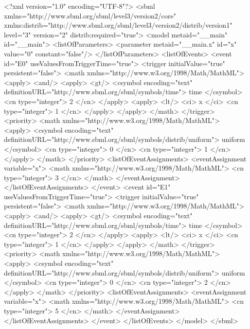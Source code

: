 \documentclass[draftspec]{sbmlpkgspec}
\begin{document}
\begin{example}
<?xml version="1.0" encoding="UTF-8"?>
<sbml xmlns="http://www.sbml.org/sbml/level3/version2/core"
      xmlns:distrib="http://www.sbml.org/sbml/level3/version2/distrib/version1"
      level="3" version="2" distrib:required="true">
  <model metaid="__main" id="__main">
    <listOfParameters>
      <parameter metaid="__main.x" id="x" value="0" constant="false"/>
    </listOfParameters>
    <listOfEvents>
      <event id="E0" useValuesFromTriggerTime="true">
        <trigger initialValue="true" persistent="false">
          <math xmlns="http://www.w3.org/1998/Math/MathML">
            <apply>
              <and/>
              <apply>
                <gt/>
                <csymbol encoding="text" definitionURL="http://www.sbml.org/sbml/symbols/time">
                         time </csymbol>
                <cn type="integer"> 2 </cn>
              </apply>
              <apply>
                <lt/>
                <ci> x </ci>
                <cn type="integer"> 1 </cn>
              </apply>
            </apply>
          </math>
        </trigger>
        <priority>
          <math xmlns="http://www.w3.org/1998/Math/MathML">
            <apply>
              <csymbol encoding="text" definitionURL="http://www.sbml.org/sbml/symbols/distrib/uniform">
                       uniform </csymbol>
              <cn type="integer"> 0 </cn>
              <cn type="integer"> 1 </cn>
            </apply>
          </math>
        </priority>
        <listOfEventAssignments>
          <eventAssignment variable="x">
            <math xmlns="http://www.w3.org/1998/Math/MathML">
              <cn type="integer"> 3 </cn>
            </math>
          </eventAssignment>
        </listOfEventAssignments>
      </event>
      <event id="E1" useValuesFromTriggerTime="true">
        <trigger initialValue="true" persistent="false">
          <math xmlns="http://www.w3.org/1998/Math/MathML">
            <apply>
              <and/>
              <apply>
                <gt/>
                <csymbol encoding="text" definitionURL="http://www.sbml.org/sbml/symbols/time">
                         time </csymbol>
                <cn type="integer"> 2 </cn>
              </apply>
              <apply>
                <lt/>
                <ci> x </ci>
                <cn type="integer"> 1 </cn>
              </apply>
            </apply>
          </math>
        </trigger>
        <priority>
          <math xmlns="http://www.w3.org/1998/Math/MathML">
            <apply>
              <csymbol encoding="text" definitionURL="http://www.sbml.org/sbml/symbols/distrib/uniform">
                       uniform </csymbol>
              <cn type="integer"> 0 </cn>
              <cn type="integer"> 2 </cn>
            </apply>
          </math>
        </priority>
        <listOfEventAssignments>
          <eventAssignment variable="x">
            <math xmlns="http://www.w3.org/1998/Math/MathML">
              <cn type="integer"> 5 </cn>
            </math>
          </eventAssignment>
        </listOfEventAssignments>
      </event>
    </listOfEvents>
  </model>
</sbml>
\end{example}
\end{document}
